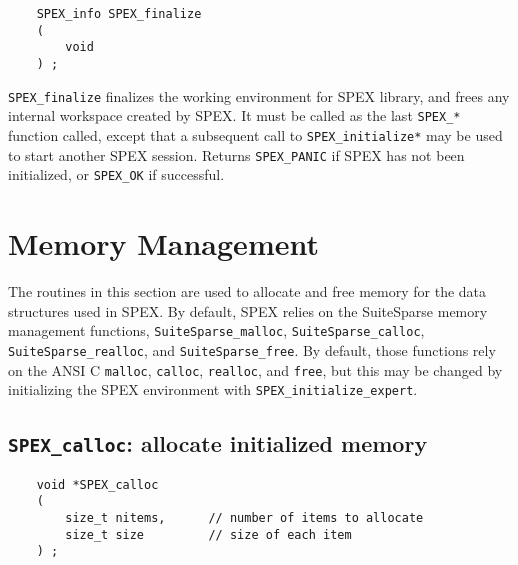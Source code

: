 \documentclass[12pt]{report}
\theoremstyle{definition}
\begin{document}
\begin{mdframed}[userdefinedwidth=6in]
{\footnotesize
\begin{verbatim}
    SPEX_info SPEX_finalize
    (
        void
    ) ;
\end{verbatim}
} \end{mdframed}

\verb|SPEX_finalize| finalizes the working environment for SPEX
library, and frees any internal workspace created by SPEX.  It must be
called as the last \verb|SPEX_*| function called, except that a subsequent
call to \verb|SPEX_initialize*| may be used to start another SPEX session.
Returns \verb|SPEX_PANIC| if SPEX has not been initialized,
or \verb|SPEX_OK| if successful.

\section{Memory Management} \label{s:user:memmanag}

The routines in this section are used to allocate and free memory for the data
structures used in SPEX.  By default, SPEX relies on the SuiteSparse
memory management functions, \verb|SuiteSparse_malloc|,
\verb|SuiteSparse_calloc|, \verb|SuiteSparse_realloc|, and
\verb|SuiteSparse_free|.  By default, those functions rely on the ANSI C
\verb|malloc|, \verb|calloc|, \verb|realloc|, and \verb|free|, but this may be
changed by initializing the SPEX environment with
\verb|SPEX_initialize_expert|.

\cprotect\subsection{\verb|SPEX_calloc|: allocate initialized memory}
\label{ss:SPEX_calloc}

\begin{mdframed}[userdefinedwidth=6in]
{\footnotesize
\begin{verbatim}
    void *SPEX_calloc 
    ( 
        size_t nitems,      // number of items to allocate 
        size_t size         // size of each item 
    ) ;
\end{verbatim}
} \end{mdframed}
\end{document}
